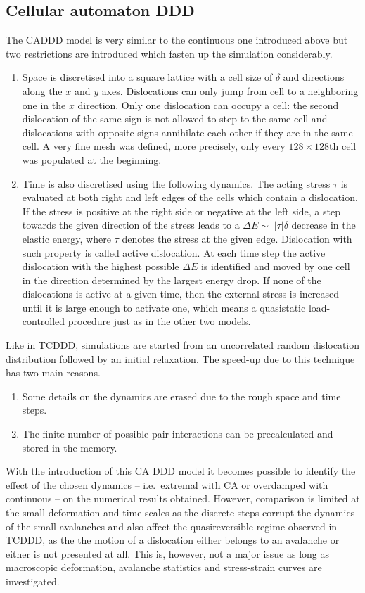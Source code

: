 \subsection{Cellular automaton DDD} \label{sec:weakest_CADDD}
The CADDD model is very similar to the continuous one introduced above but two restrictions are introduced which fasten up the simulation considerably.
\begin{enumerate}
\item Space is discretised into a square lattice with a cell size of $\delta$ and directions along the $x$ and $y$ axes. Dislocations can only jump from cell to a neighboring one in the $x$ direction. Only one dislocation can occupy a cell: the second dislocation of the same sign is not allowed to step to the same cell and dislocations with opposite signs annihilate each other if they are in the same cell. A very fine mesh was defined, more precisely, only every $128 \times 128$th cell was populated at the beginning.
\item Time is also discretised using the following dynamics. The acting stress $\tau$ is evaluated at both right and left edges of the cells which contain a dislocation. If the stress is positive at the right side or negative at the left side, a step towards the given direction of the stress leads to a $\Delta E \sim \;\left| \tau  \right|\delta $ decrease in the elastic energy, where $\tau$ denotes the stress at the given edge. Dislocation with such property is called active dislocation. At each time step the active dislocation with the highest possible $\Delta E$ is identified and moved by one cell in the direction determined by the largest energy drop. If none of the dislocations is active at a given time, then the external stress is increased until it is large enough to activate one, which means a quasistatic load-controlled procedure just as in the other two models.
\end{enumerate}
Like in TCDDD, simulations are started from an uncorrelated random dislocation distribution followed by an initial relaxation. The speed-up due to this technique has two main reasons.
\begin{enumerate}
\item Some details on the dynamics are erased due to the rough space and time steps.
\item The finite number of possible pair-interactions can be precalculated and stored in the memory. 
\end{enumerate}
With the introduction of this CA DDD model it becomes possible to identify the effect of the chosen dynamics -- i.e.\ extremal with CA or overdamped with continuous -- on the numerical results obtained. However, comparison is limited at the small deformation and time scales as the discrete steps corrupt the dynamics of the small avalanches and also affect the quasireversible regime observed in TCDDD, as the the motion of a dislocation either belongs to an avalanche or either is not presented at all. This is, however, not a major issue as long as macroscopic deformation, avalanche statistics and stress-strain curves are investigated.

